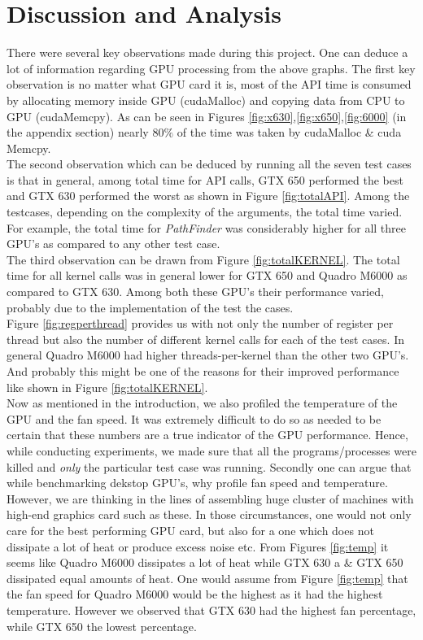 \documentclass[paper=a4, fontsize=11pt]{scrartcl}
\numberwithin{equation}{section}		%
\numberwithin{figure}{section}			%
\numberwithin{table}{section}				%
\begin{document}
\newpage
\section{Discussion and Analysis}

There were several key observations made during this project. One can deduce a lot of information regarding GPU processing from the above graphs. The first key observation is no matter what GPU card it is, most of the API time is consumed by allocating memory inside GPU (cudaMalloc) and copying data from CPU to GPU (cudaMemcpy). As can be seen in Figures \ref{fig:x630},\ref{fig:x650},\ref{fig:6000} (in the appendix section) nearly 80$\%$ of the time was taken by cudaMalloc \& cuda Memcpy. \\

The second observation which can be deduced by running all the seven test cases is that in general, among total time for API calls, GTX 650 performed the best and GTX 630 performed the worst as shown in Figure \ref{fig:totalAPI}. Among the testcases, depending on the complexity of the arguments, the total time varied. For example, the total time for \textit{PathFinder} was considerably higher for all three GPU's as compared to any other test case.\\

The third observation can be drawn from Figure \ref{fig:totalKERNEL}. The total time for all kernel calls was in general lower for GTX 650 and Quadro M6000 as compared to GTX 630. Among both these GPU's their performance varied, probably due to the implementation of the test the cases. \\

Figure \ref{fig:regperthread} provides us with not only the number of register per thread but also the number of different kernel calls for each of the test cases. In general Quadro M6000 had higher threads-per-kernel than the other two GPU's. And probably this might be one of the reasons for their improved performance like shown in Figure \ref{fig:totalKERNEL}. \\

Now as mentioned in the introduction, we also profiled the temperature of the GPU and the fan speed. It was extremely difficult to do so as needed to be certain that these numbers are a true indicator of the GPU performance. Hence, while conducting experiments, we made sure that all the programs/processes were killed and \emph{only} the particular test case was running. Secondly one can argue that while benchmarking dekstop GPU's, why profile fan speed and temperature. However, we are thinking in the lines of assembling huge cluster of machines with high-end graphics card such as these. In those circumstances, one would not only care for the best performing GPU card, but also for a one which does not dissipate a lot of heat or produce excess noise etc. From Figures \ref{fig:temp} it seems like Quadro M6000 dissipates a lot of heat while GTX 630 a \& GTX 650 dissipated equal amounts of heat. One would assume from Figure \ref{fig:temp} that the fan speed for Quadro M6000 would be the highest as it had the highest temperature. However we observed that GTX 630 had the highest fan percentage, while GTX 650 the lowest percentage.
\end{document}
